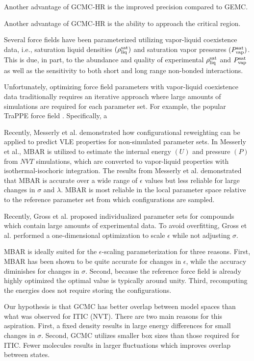 \documentclass[11pt,a4paper]{article}
\begin{document}
Another advantage of GCMC-HR is the improved precision compared to GEMC.

Another advantage of GCMC-HR is the ability to approach the critical region.

Several force fields have been parameterized utilizing vapor-liquid coexistence data, i.e., saturation liquid densities $(\rho_{\rm liq}^{\rm sat})$ and saturation vapor pressures $(P_{\rm vap}^{\rm sat})$. This is due, in part, to the abundance and quality of experimental $\rho_{\rm liq}^{\rm sat}$ and $P_{\rm vap}^{\rm sat}$ as well as the sensitivity to both short and long range non-bonded interactions.

Unfortunately, optimizing force field parameters with vapor-liquid coexistence data traditionally requires an iterative approach where large amounts of simulations are required for each parameter set. For example, the popular TraPPE force field . Specifically, a 

Recently, Messerly et al. demonstrated how configurational reweighting can be applied to predict VLE properties for non-simulated parameter sets. In Messerly et al., MBAR is utilized to estimate the internal energy $(U)$ and pressure $(P)$ from $NVT$ simulations, which are converted to vapor-liquid properties with isothermal-isochoric integration. The results from Messerly et al. demonstrated that MBAR is accurate over a wide range of $\epsilon$ values but less reliable for large changes in $\sigma$ and $\lambda$. MBAR is most reliable in the local parameter space relative to the reference parameter set from which configurations are sampled.

Recently, Gross et al. proposed individualized parameter sets for compounds which contain large amounts of experimental data. To avoid overfitting, Gross et al. performed a one-dimensional optimization to scale $\epsilon$ while not adjusting $\sigma$. 

MBAR is ideally suited for the $\epsilon$-scaling parameterization for three reasons. First, MBAR has been shown to be quite accurate for changes in $\epsilon$, while the accuracy diminishes for changes in $\sigma$. Second, because the reference force field is already highly optimized the optimal value is typically around unity. Third, recomputing the energies does not require storing the configurations.

Our hypothesis is that GCMC has better overlap between model spaces than what was observed for ITIC (NVT). There are two main reasons for this aspiration. First, a fixed density results in large energy differences for small changes in $\sigma$. Second, GCMC utilizes smaller box sizes than those required for ITIC. Fewer molecules results in larger fluctuations which improves overlap between states.
\end{document}
